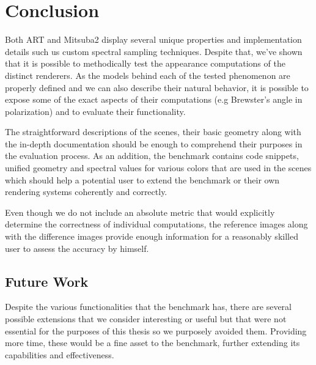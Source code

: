 \chapter*{Conclusion}

Both ART and Mitsuba2 display several unique properties and implementation details such us custom spectral sampling techniques. Despite that, we've shown that it is possible to methodically test the appearance computations of the distinct renderers. As the models behind each of the tested phenomenon are properly defined and we can also describe their natural behavior, it is possible to expose some of the exact aspects of their computations (e.g Brewster's angle in polarization) and to evaluate their functionality.

The straightforward descriptions of the scenes, their basic geometry along with the in-depth documentation should be enough to comprehend their purposes in the evaluation process. As an addition, the benchmark contains code snippets, unified geometry and spectral values for various colors that are used in the scenes which should help a potential user to extend the benchmark or their own rendering systems coherently and correctly.

Even though we do not include an absolute metric that would explicitly determine the correctness of individual computations, the reference images along with the difference images provide enough information for a reasonably skilled user to assess the accuracy by himself.

\section{Future Work}

Despite the various functionalities that the benchmark has, there are several possible extensions that we consider interesting or useful but that were not essential for the purposes of this thesis so we purposely avoided them. Providing more time, these would be a fine asset to the benchmark, further extending its capabilities and effectiveness.


